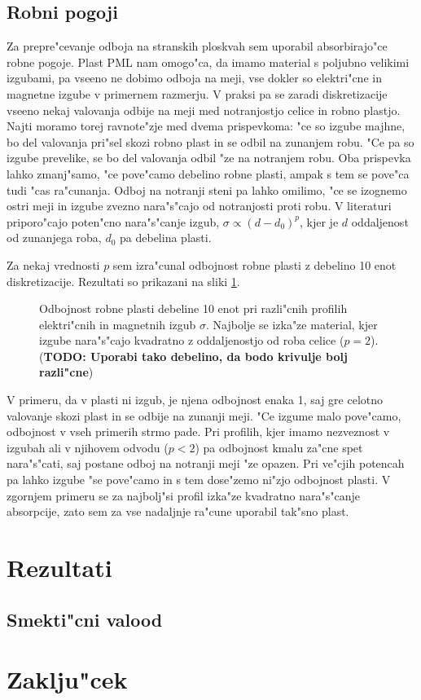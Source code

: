 \documentclass[a4paper,10pt]{article}
\newcommand{\todo}[1]{(\textbf{\textsc{TODO}: #1})}
\begin{document}
\newpage
\subsection{Robni pogoji}

Za prepre"cevanje odboja na stranskih ploskvah sem uporabil absorbirajo"ce robne pogoje. 
Plast PML nam omogo"ca, da imamo material s poljubno velikimi izgubami, pa vseeno ne dobimo odboja na meji, vse dokler so elektri"cne in magnetne izgube v primernem razmerju. 
V praksi pa se zaradi diskretizacije vseeno nekaj valovanja odbije na meji med notranjostjo celice in robno plastjo. 
Najti moramo torej ravnote"zje med dvema prispevkoma: "ce so izgube majhne, bo del valovanja pri"sel skozi robno plast in se odbil na zunanjem robu. 
"Ce pa so izgube prevelike, se bo del valovanja odbil "ze na notranjem robu. 
Oba prispevka lahko zmanj"samo, "ce pove"camo debelino robne plasti, ampak s tem se pove"ca tudi "cas ra"cunanja. 
Odboj na notranji steni pa lahko omilimo, "ce se izognemo ostri meji in izgube zvezno nara"s"cajo od notranjosti proti robu. 
V literaturi\cite{taflove} priporo"cajo poten"cno nara"s"canje izgub, $\sigma \propto (d-d_0)^{p}$, kjer je $d$ oddaljenost od zunanjega roba, $d_0$ pa debelina plasti. 

Za nekaj vrednosti $p$ sem izra"cunal odbojnost robne plasti z debelino 10 enot diskretizacije. Rezultati so prikazani na sliki \ref{fig:test-absorption}. 

\begin{figure}[h]
 
 \caption{Odbojnost robne plasti debeline 10 enot pri razli"cnih profilih elektri"cnih in magnetnih izgub $\sigma$. Najbolje se izka"ze material, kjer izgube nara"s"cajo kvadratno z oddaljenostjo od roba celice ($p=2$). 
 \todo{Uporabi tako debelino, da bodo krivulje bolj razli"cne}
 }
 \label{fig:test-absorption}
\end{figure}

V primeru, da v plasti ni izgub, je njena odbojnost enaka 1, saj gre celotno valovanje skozi plast in se odbije na zunanji meji. 
"Ce izgume malo pove"camo, odbojnost v vseh primerih strmo pade. 
Pri profilih, kjer imamo nezveznost v izgubah ali v njihovem odvodu ($p<2$) pa odbojnost kmalu za"cne spet nara"s"cati, saj postane odboj na notranji meji "ze opazen.
Pri ve"cjih potencah pa lahko izgube "se pove"camo in s tem dose"zemo ni"zjo odbojnost plasti. 
V zgornjem primeru se za najbolj"si profil izka"ze kvadratno nara"s"canje absorpcije, zato sem za vse nadaljnje ra"cune uporabil tak"sno plast. 

\section{Rezultati}

\subsection{Smekti"cni valood}



\section{Zaklju"cek}

\newpage


\end{document}

